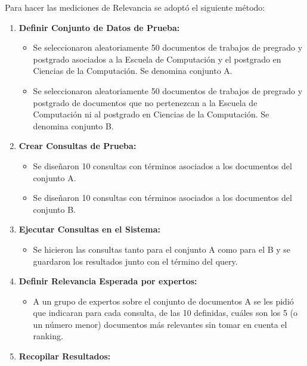 \documentclass[
  12pt,
  openany]{book}
\providecommand{\tightlist}{%
  \setlength{\itemsep}{0pt}\setlength{\parskip}{0pt}}
\begin{document}
Para hacer las mediciones de Relevancia se adoptó el siguiente método:

\begin{enumerate}
\def\labelenumi{\arabic{enumi}.}
\tightlist
\item
  \textbf{Definir Conjunto de Datos de Prueba:}

  \begin{itemize}
  \tightlist
  \item
    Se seleccionaron aleatoriamente 50 documentos de trabajos de pregrado y postgrado asociados a la Escuela de Computación y el postgrado en Ciencias de la Computación. Se denomina conjunto A.
  \item
    Se seleccionaron aleatoriamente 50 documentos de trabajos de pregrado y postgrado de documentos que no pertenezcan a la Escuela de Computación ni al postgrado en Ciencias de la Computación. Se denomina conjunto B.
  \end{itemize}
\item
  \textbf{Crear Consultas de Prueba:}

  \begin{itemize}
  \tightlist
  \item
    Se diseñaron 10 consultas con términos asociados a los documentos del conjunto A.
  \item
    Se diseñaron 10 consultas con términos asociados a los documentos del conjunto B.
  \end{itemize}
\item
  \textbf{Ejecutar Consultas en el Sistema:}

  \begin{itemize}
  \tightlist
  \item
    Se hicieron las consultas tanto para el conjunto A como para el B y se guardaron los resultados junto con el término del query.
  \end{itemize}
\item
  \textbf{Definir Relevancia Esperada por expertos:}

  \begin{itemize}
  \tightlist
  \item
    A un grupo de expertos sobre el conjunto de documentos A se les pidió que indicaran para cada consulta, de las 10 definidas, cuáles son los 5 (o un número menor) documentos más relevantes sin tomar en cuenta el ranking.
  \end{itemize}
\item
  \textbf{Recopilar Resultados:}


\end{enumerate}
\end{document}
